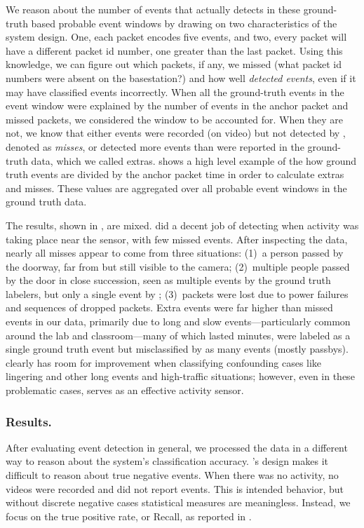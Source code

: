We reason about the number of events that \sysname actually detects in these ground-truth based probable event windows by drawing on two characteristics of the system design. 
One, each packet encodes five events, and two, every packet will have a different packet id number, one greater than the last packet.
Using this knowledge, we can figure out which packets, if any, we missed (what packet id numbers were absent on the basestation?) and how well \sysname \textit{detected events}, even if it may have classified events incorrectly.
When all the ground-truth events in the event window were explained by the number of events in the anchor packet and missed packets, we considered the window to be accounted for. 
When they are not, we know that either events were recorded (on video) but not detected by \sysname, denoted as \emph{misses}, or \sysname detected more events than were reported in the ground-truth data, which we called extras. 
 shows a high level example of the how ground truth events are divided by the anchor packet time in order to calculate extras and misses. 
These values are aggregated over all probable event windows in the ground truth data.

The results, shown in , are mixed.  
\sysname did a decent job of detecting when activity was taking place near the sensor, with few missed events.
After inspecting the data, nearly all misses appear to come from three situations: (1)~a person passed by the doorway, far from \sysname but still visible to the camera; (2)~multiple people passed by the door in close succession, seen as multiple events by the ground truth labelers, but only a single event by \sysname;
(3)~packets were lost due to \sysname power failures and sequences of dropped packets. 
Extra events were far higher than missed events in our data, primarily due to long and slow events---particularly common around the lab and classroom---many of which lasted minutes, were labeled as a single ground truth event but misclassified by \sysname as many events (mostly passbys).
\sysname clearly has room for improvement when classifying confounding cases like lingering and other long events and high-traffic situations; however, even in these problematic cases, \sysname serves as an effective activity sensor. 

\subsubsection{Results.}
After evaluating \sysname event detection in general, we processed the data in a different way to reason about the system's classification accuracy. 
\sysname's design makes it difficult to reason about true negative events. When there was no activity, no videos were recorded and \sysname did not report events.
This is intended behavior, but without discrete negative cases statistical measures are meaningless.
Instead, we focus on the true positive rate, or Recall, as reported in .   

